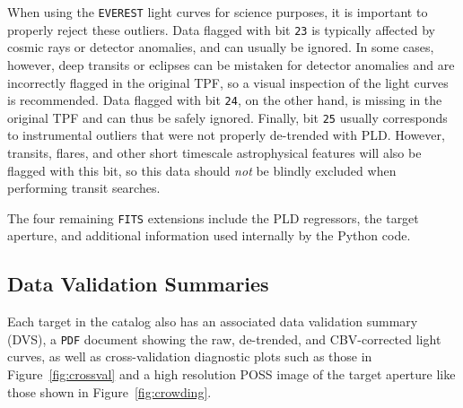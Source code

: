 \documentclass[]{emulateapj}
\begin{document}
%
When using the \texttt{EVEREST} light curves for science purposes, it is important
to properly reject these outliers. Data flagged with bit \texttt{23} is typically
affected by cosmic rays or detector anomalies, and can usually be ignored. In
some cases, however, deep transits or eclipses can be mistaken for detector
anomalies and are incorrectly flagged in the original TPF, so a visual inspection
of the light curves is recommended. Data flagged with bit \texttt{24}, on the other
hand, is missing in the original TPF and can thus be safely ignored. Finally, bit
\texttt{25} usually corresponds to instrumental outliers that were not properly
de-trended with PLD. However, transits, flares, and other short timescale astrophysical
features will also be flagged with this bit, so this data should \emph{not} be
blindly excluded when performing transit searches.

The four remaining \texttt{FITS} extensions include the PLD regressors, the target aperture,
and additional information used internally by the Python code.

\subsection{Data Validation Summaries}
\label{sec:dvs}
Each target in the catalog also has an associated data validation summary (DVS), a
\texttt{PDF} document showing the raw, de-trended, and CBV-corrected light curves,
as well as cross-validation diagnostic plots such as those in Figure~\ref{fig:crossval}
and a high resolution POSS image of the target aperture like those shown in
Figure~\ref{fig:crowding}.
\end{document}
